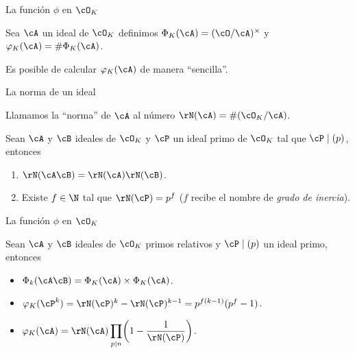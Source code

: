 \begin{frame}{La función $\phi$ en $\cO_K$}
  \begin{definition}
    Sea $\cA$ un ideal de $\cO_K$ definimos $\Phi_K(\cA) = (\cO/\cA)^\times$ y $\varphi_K(\cA) = \#\Phi_K(\cA)$.
  \end{definition}

  \pause\bigskip
Es posible de calcular $\varphi_K(\cA)$ de manera ``sencilla''.
\end{frame}


\begin{frame}{La norma de un ideal}
  \begin{definition}
    Llamamos la ``norma'' de $\cA$ al número $\rN(\cA) = \#(\cO_K/\cA)$.
\end{definition}

\pause\bigskip

\begin{proposition}
    Sean $\cA$ y $\cB$ ideales de $\cO_K$ y $\cP$ un ideal primo de $\cO_K$ tal que $\cP \mid (p)$, entonces
    \begin{enumerate}
        \item $\rN(\cA\cB)=\rN(\cA)\rN(\cB)$.
        \bigskip

        \item Existe $f\in\N$ tal que $\rN(\cP) = p^f$ \pause ($f$ recibe el nombre de \emph{grado de inercia}).
    \end{enumerate}
\end{proposition}
\end{frame}


\begin{frame}{La función $\phi$ en $\cO_K$}
  \begin{proposition}
    Sean $\cA$ y $\cB$ ideales de $\cO_K$ primos relativos y $\cP \mid (p)$ un ideal primo, entonces
    \pause
    \begin{itemize}[<+->]
        \item $\Phi_k(\cA\cB) = \Phi_K(\cA) \times \Phi_K(\cA)$.
        \bigskip

        \item $\varphi_K(\cP^k) = \rN(\cP)^k-\rN(\cP)^{k-1} = p^{f(k-1)}(p^f-1) $.
        \bigskip
        
        \item $\ds \varphi_K(\cA) = \rN(\cA) \prod_{p\mid n}\paren{1-\frac{1}{\rN(\cP)}}$.
    \end{itemize}
\end{proposition}
\end{frame}


